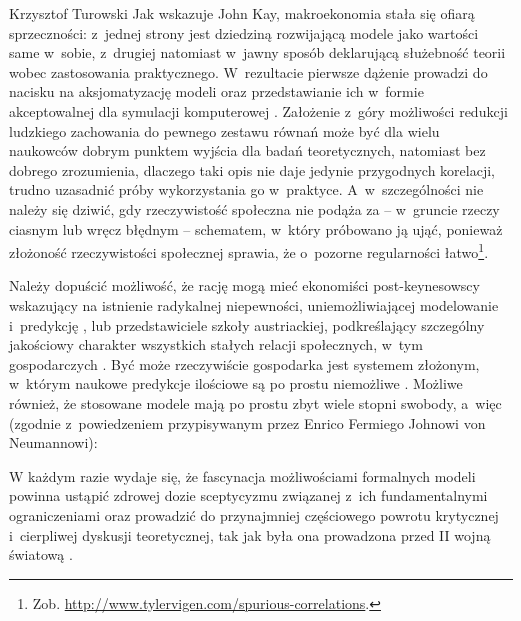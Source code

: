 \begin{artplenv}{Krzysztof Turowski}
Jak wskazuje John Kay, makroekonomia stała się ofiarą sprzeczności: z~jednej strony jest dziedziną rozwijającą modele
jako wartości same w~sobie, z~drugiej natomiast w~jawny sposób deklarującą służebność teorii wobec zastosowania
praktycznego. W~rezultacie pierwsze dążenie prowadzi do nacisku na aksjomatyzację modeli oraz przedstawianie
ich w~formie akceptowalnej dla symulacji komputerowej
\parencite{kay_map_2012}.
Założenie z~góry możliwości
redukcji ludzkiego zachowania do pewnego zestawu równań może być dla wielu naukowców dobrym punktem wyjścia dla badań
teoretycznych, natomiast bez dobrego zrozumienia, dlaczego taki opis nie daje jedynie przygodnych korelacji, trudno
uzasadnić próby wykorzystania go w~praktyce. A~w~szczególności nie należy się dziwić, gdy rzeczywistość społeczna nie
podąża za  --  w~gruncie rzeczy ciasnym lub wręcz błędnym  --  schematem, w~który próbowano ją ująć,
ponieważ złożoność rzeczywistości społecznej sprawia, że o~pozorne regularności łatwo\footnote{Zob.
\url{http://www.tylervigen.com/spurious-correlations}.}.

Należy dopuścić możliwość, że rację mogą mieć ekonomiści post-keynesowscy wskazujący na istnienie radykalnej
niepewności, uniemożliwiającej modelowanie i~predykcję
\parencite{davidson_keynes_2009},
lub przedstawiciele
szkoły austriackiej, podkreślający szczególny jakościowy charakter wszystkich stałych relacji społecznych, w~tym
gospodarczych
\parencite{mises_ludzkie_2007}.
Być może rzeczywiście gospodarka jest systemem złożonym, w~którym
naukowe predykcje ilościowe są po prostu niemożliwe
\parencite{hayek_theory_1964}.
Możliwe również, że stosowane modele mają po
prostu zbyt wiele stopni swobody, a~więc (zgodnie z~powiedzeniem przypisywanym przez Enrico
Fermiego Johnowi von Neumannowi):


W każdym razie wydaje się, że fascynacja możliwościami formalnych modeli powinna ustąpić zdrowej dozie sceptycyzmu
związanej z~ich fundamentalnymi ograniczeniami oraz prowadzić do przynajmniej częściowego powrotu krytycznej i~cierpliwej
dyskusji teoretycznej, tak jak była ona prowadzona przed II wojną światową
\parencite{blaug_formalist_2003_tur}.


\end{artplenv}
